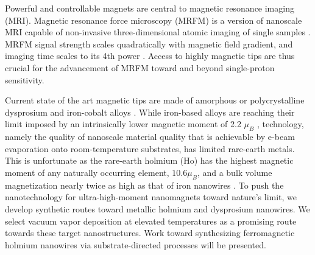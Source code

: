 Powerful and controllable magnets are central to magnetic resonance imaging (MRI). Magnetic resonance force microscopy (MRFM) is a version of nanoscale MRI capable of non-invasive three-dimensional atomic imaging of single samples \cite{Degen_2009,Nichol_2013}.  MRFM signal strength scales quadratically with magnetic field gradient, and imaging time scales to its 4th power \cite{Degen_2009}.  Access to highly magnetic tips are thus crucial for the advancement of MRFM toward and beyond single-proton sensitivity.

Current state of the art magnetic tips are made of amorphous or polycrystalline dysprosium and iron-cobalt alloys \cite{Mamin_2012,Longenecker_2012}. While iron-based alloys are reaching their limit imposed by an intrinsically lower magnetic moment of 2.2 $\mu_B$ \cite{Longenecker_2012,Shamsudhin_2016}, technology, namely the quality of nanoscale material quality that is achievable by e-beam evaporation onto room-temperature substrates, has limited rare-earth metals.    This is unfortunate as the rare-earth holmium (Ho) has the highest magnetic moment of any naturally occurring element, $10.6 \mu_B$, and a bulk volume magnetization nearly twice as high as that of iron nanowires \cite{Rhodes_1958}.  To push the nanotechnology for ultra-high-moment nanomagnets toward nature's limit, we develop synthetic routes toward metallic holmium and dysprosium nanowires.  We select vacuum vapor deposition at elevated temperatures as a promising route towards these target nanostructures\cite{Horprathum_2014,Eames_2006,Chen_2007}.  Work toward synthesizing ferromagnetic holmium nanowires via substrate-directed processes will be presented.